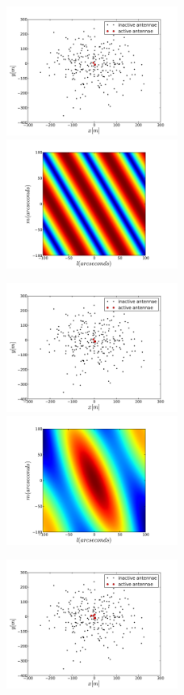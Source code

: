 \documentclass[11pt,letterpaper]{article}
\begin{document}
\begin{figure}[!h]
\centerline{
\includegraphics[width=0.5\textwidth]{2_closestantennae.pdf}
\includegraphics[width=0.5\textwidth]{DFT_image_2closest_nobeam.pdf}
}
\centerline{
\includegraphics[width=0.5\textwidth]{4_closestantennae.pdf}
\includegraphics[width=0.5\textwidth]{DFT_image_4closest_nobeam.pdf}
}
\centerline{
\includegraphics[width=0.5\textwidth]{6_closestantennae.pdf}
}
\end{figure}
\end{document}
